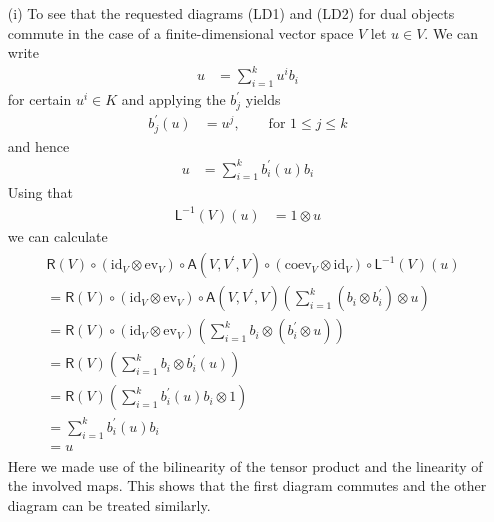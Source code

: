 \begin{prf}
\begin{enumerate}
\item[(i)]
To see that the requested diagrams (LD1) and (LD2) for dual objects commute in the case of a finite-dimensional vector space $V$ let $u \in V$. We can write
\begin{align*}
  u
  &=
  \sum_{i=1}^{k}
  u^{i}
  b_{i}
\end{align*}
for certain $u^{i} \in K$ and applying the $b_{j}^{\prime}$ yields
\begin{align*}
  b_{j}^{\prime}(u)
  &=
  u^{j}
  ,\qquad
  \text{for }
  1
  \leq
  j
  \leq k
\end{align*}
and hence
\begin{align*}
  u
  &=
  \sum_{i=1}^{k}
  b_{i}^{\prime}(u)
  b_{i}
\end{align*}
Using that
\begin{align*}
  \mathsf{L}^{-1}(V)(u)
  &=
  1
  \otimes
  u
\end{align*}
we can calculate
\begin{align}
\label{vecld1}
\begin{split}
  &
  \mathsf{R}(V)
  \circ
  \left(
    \mathrm{id}_{V}
    \otimes
    \mathrm{ev}_{V}
  \right)
  \circ
  \mathsf{A}(V,V^{\prime},V)
  \circ
  \left(
    \mathrm{coev}_{V}
    \otimes
    \mathrm{id}_{V}
  \right)
  \circ
  \mathsf{L}^{-1}(V)(u)
  \\
  &=
  \mathsf{R}(V)
  \circ
  \left(
    \mathrm{id}_{V}
    \otimes
    \mathrm{ev}_{V}
  \right)
  \circ
  \mathsf{A}(V,V^{\prime},V)
  \left(
    \sum_{i = 1}^{k}
    \left(
      b_{i}
      \otimes
      b_{i}^{\prime}
    \right)
    \otimes
    u
  \right)
  \\
  &=
  \mathsf{R}(V)
  \circ
  \left(
    \mathrm{id}_{V}
    \otimes
    \mathrm{ev}_{V}
  \right)
  \left(
    \sum_{i = 1}^{k}
    b_{i}
    \otimes
    \left(
      b_{i}^{\prime}
      \otimes
      u
    \right)
  \right)
  \\
  &=
  \mathsf{R}(V)
  \left(
    \sum_{i = 1}^{k}
    b_{i}
    \otimes
    b_{i}^{\prime}(u)
  \right)
  \\
  &=
  \mathsf{R}(V)
  \left(
    \sum_{i = 1}^{k}
    b_{i}^{\prime}(u)
    b_{i}
    \otimes
    1
  \right)
  \\
  &=
  \sum_{i = 1}^{k}
  b_{i}^{\prime}(u)
  b_{i}
  \\
  &=
  u
\end{split}
\end{align}
Here we made use of the bilinearity of the tensor product and the linearity of the involved maps. This shows that the first diagram commutes and the other diagram can be treated similarly.


\end{enumerate}
\end{prf}
